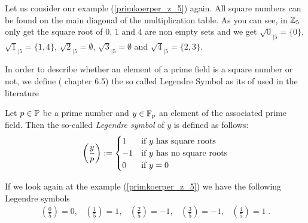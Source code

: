 \begin{example}  Let us consider our example (\ref{primkoerper_z_5}) again. All square numbers can be found on the main diagonal of the multiplication table. As you can see, in $ \mathbb{Z}_5 $ only get the square root of $ 0 $, $ 1 $ and $ 4 $ are non empty sets and we get $ \sqrt{0}_{| 5} = \{0 \} $, $ \sqrt{1}_{| 5} = \{1,4 \} $, $ \sqrt{2}_{ | 5} = \emptyset $, $ \sqrt{3}_{| 5} = \emptyset $ and $ \sqrt{4}_{| 5} = \{2,3 \} $.
\end{example}
In order to describe whether an element of a prime field is a square number  or not, we define (\cite{HW} chapter 6.5) the so called Legendre Symbol as its of used in the literature
\begin{definition} Let $ p \in \mathbb{P} $ be a prime number and $ y \in \mathbb{F}_p $ an element of the associated prime field. Then the so-called \textit{Legendre symbol} of $ y $ is defined as follows:
\begin{equation}
\label{eq: Legendre-symbol}
\left (\frac{y}{p} \right): =
\begin{cases}
1 & \text{if $ y $ has square roots} \\
-1 & \text{if $ y $ has no square roots} \\
0 & \text{if $ y = 0 $}
\end{cases}
\end{equation}
\end{definition}
\begin{example}
If we look again at the example (\ref{primkoerper_z_5}) we have the following Legendre symbols
$$
\begin{array}{ccccc}
\left (\frac{0}{5} \right) = 0, &
\left (\frac{1}{5} \right) = 1, &
\left (\frac{2}{5} \right) = -1, &
\left (\frac{3}{5} \right) = -1, &
\left (\frac{4}{5} \right) = 1 \;.
\end{array}
$$
\end{example}

